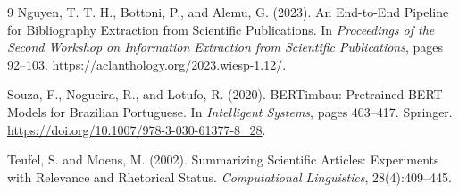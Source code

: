 \documentclass[12pt]{article}
\begin{document}
\begin{thebibliography}{9}
Nguyen, T. T. H., Bottoni, P., and Alemu, G. (2023).
\newblock An End-to-End Pipeline for Bibliography Extraction from Scientific Publications.
\newblock In \textit{Proceedings of the Second Workshop on Information Extraction from Scientific Publications}, pages 92--103.
\newblock \url{https://aclanthology.org/2023.wiesp-1.12/}.

Souza, F., Nogueira, R., and Lotufo, R. (2020).
\newblock BERTimbau: Pretrained BERT Models for Brazilian Portuguese.
\newblock In \textit{Intelligent Systems}, pages 403--417. Springer.
\newblock \url{https://doi.org/10.1007/978-3-030-61377-8_28}.

Teufel, S. and Moens, M. (2002).
\newblock Summarizing Scientific Articles: Experiments with Relevance and Rhetorical Status.
\newblock \textit{Computational Linguistics}, 28(4):409--445.

\end{thebibliography}
\end{document}
